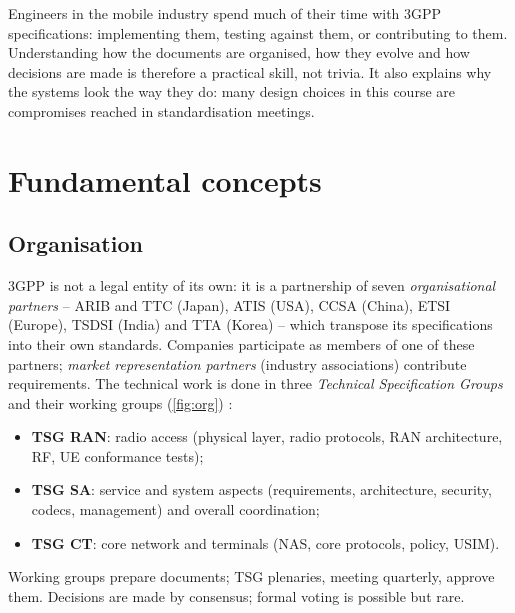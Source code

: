 \documentclass[11pt,a4paper]{article}
\begin{document}
Engineers in the mobile industry spend much of their time with 3GPP specifications: implementing them, testing
against them, or contributing to them. Understanding how the documents are organised, how they evolve and how
decisions are made is therefore a practical skill, not trivia. It also explains why the systems look the way
they do: many design choices in this course are compromises reached in standardisation meetings.

\section{Fundamental concepts}

\subsection{Organisation}
3GPP is not a legal entity of its own: it is a partnership of seven \emph{organisational partners} -- ARIB and TTC
(Japan), ATIS (USA), CCSA (China), ETSI (Europe), TSDSI (India) and TTA (Korea) -- which transpose its specifications
into their own standards. Companies participate as members of one of these partners; \emph{market representation
partners} (industry associations) contribute requirements. The technical work is done in three \emph{Technical
Specification Groups} and their working groups (\cref{fig:org}) \cite{tr21900}:
\begin{itemize}
  \item \textbf{TSG RAN}: radio access (physical layer, radio protocols, RAN architecture, RF, UE conformance tests);
  \item \textbf{TSG SA}: service and system aspects (requirements, architecture, security, codecs, management) and overall
        coordination;
  \item \textbf{TSG CT}: core network and terminals (NAS, core protocols, policy, USIM).
\end{itemize}
Working groups prepare documents; TSG plenaries, meeting quarterly, approve them. Decisions are made by consensus;
formal voting is possible but rare.

\begin{acnfigure}
  \caption{Organisation of 3GPP: organisational partners, project co-ordination, TSGs and their working groups (selection).}
  \label{fig:org}
\end{acnfigure}
\end{document}

